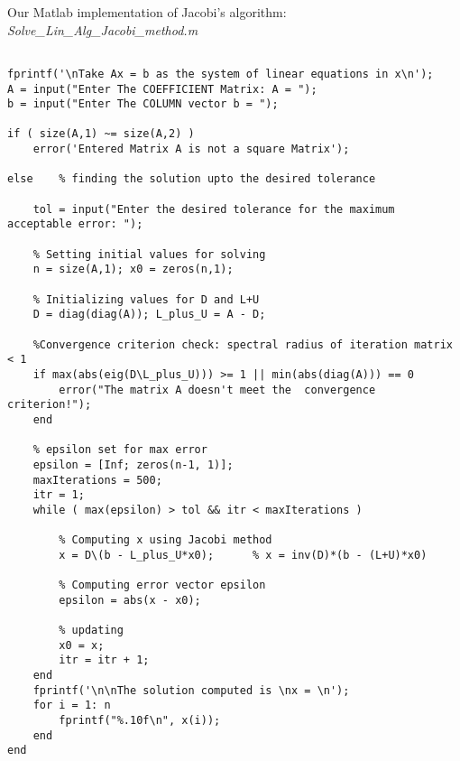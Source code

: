 \documentclass[simulation]{subfiles}
\begin{document}
Our Matlab implementation of Jacobi's algorithm: \textit{Solve\_Lin\_Alg\_Jacobi\_method.m}\\

{\footnotesize
\begin{verbatim}    
    
fprintf('\nTake Ax = b as the system of linear equations in x\n');
A = input("Enter The COEFFICIENT Matrix: A = ");
b = input("Enter The COLUMN vector b = ");

if ( size(A,1) ~= size(A,2) ) 
    error('Entered Matrix A is not a square Matrix');

else    % finding the solution upto the desired tolerance 
    
    tol = input("Enter the desired tolerance for the maximum acceptable error: ");
    
    % Setting initial values for solving
    n = size(A,1); x0 = zeros(n,1);        

    % Initializing values for D and L+U
    D = diag(diag(A)); L_plus_U = A - D;  

    %Convergence criterion check: spectral radius of iteration matrix < 1
    if max(abs(eig(D\L_plus_U))) >= 1 || min(abs(diag(A))) == 0              
        error("The matrix A doesn't meet the  convergence criterion!");
    end

    % epsilon set for max error
    epsilon = [Inf; zeros(n-1, 1)];
    maxIterations = 500;
    itr = 1;
    while ( max(epsilon) > tol && itr < maxIterations )

        % Computing x using Jacobi method
        x = D\(b - L_plus_U*x0);      % x = inv(D)*(b - (L+U)*x0)
        
        % Computing error vector epsilon
        epsilon = abs(x - x0);

        % updating
        x0 = x;
        itr = itr + 1;
    end
    fprintf('\n\nThe solution computed is \nx = \n');
    for i = 1: n
        fprintf("%.10f\n", x(i));
    end    
end
    \end{verbatim}
}

\clearpage
\end{document}
